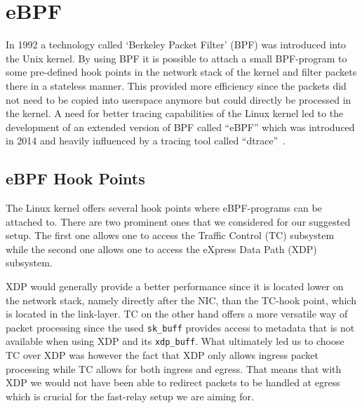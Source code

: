 \section{eBPF}\label{sec:ebpf_bg}
In 1992 a technology called `Berkeley Packet Filter' (BPF) was introduced into 
the Unix kernel.
By using BPF it is possible to attach a small BPF-program to some pre-defined hook points in 
the network stack of the kernel and filter packets there in a stateless manner.
This provided more efficiency since the packets did not need to be copied into 
userspace anymore but could directly be processed in the kernel.
A need for better tracing capabilities of the Linux kernel led to the development 
of an extended version of BPF called ``eBPF'' which was introduced in 2014 and 
heavily influenced by a tracing tool called ``dtrace''~\parencite{ebpf-intro-tigera}.


\subsection{eBPF Hook Points}
The Linux kernel offers several hook points where eBPF-programs can be attached to.
There are two prominent ones that we considered for our suggested setup.
The first one allows one to access the Traffic Control (TC) subsystem
while the second one allows one to access the eXpress Data Path (XDP) subsystem.

XDP would generally provide a better performance since it is located 
lower on the network stack, namely directly after the NIC, than the TC-hook point,
which is located in the link-layer.
TC on the other hand offers a more versatile way of packet processing since 
the used \verb|sk_buff| provides access to metadata that is not available when using 
XDP and its \verb|xdp_buff|.
What ultimately led us to choose TC over XDP was however the fact that 
XDP only allows ingress packet processing while TC allows for both ingress and egress.
That means that with XDP we would not have been able to redirect packets to be handled 
at egress which is crucial for the fast-relay setup we are aiming for.

